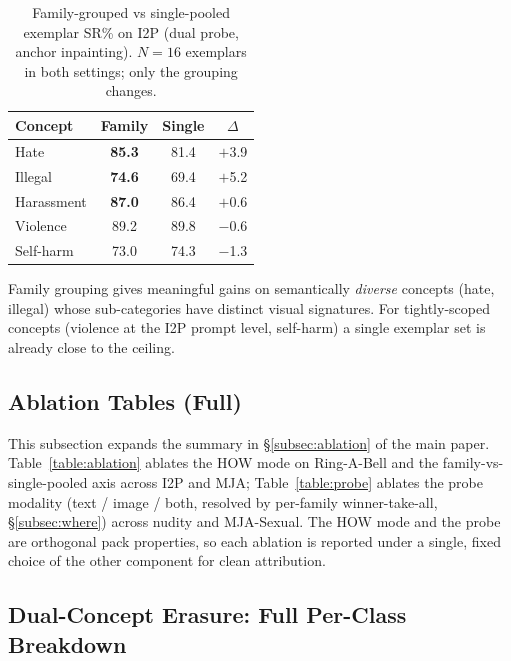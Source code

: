 \begin{table}[h]
\centering
\renewcommand{\arraystretch}{1.15}
\setlength{\tabcolsep}{0.6em}
\caption{Family-grouped vs single-pooled exemplar SR\% on I2P (dual probe, anchor inpainting). $N{=}16$ exemplars in both settings; only the grouping changes.}
\label{table:family}
\small
\begin{tabular}{lccc}
\toprule
\textbf{Concept} & \textbf{Family} & \textbf{Single} & $\Delta$ \\
\midrule
Hate        & \textbf{85.3} & 81.4 & $+$3.9 \\
Illegal     & \textbf{74.6} & 69.4 & $+$5.2 \\
Harassment  & \textbf{87.0} & 86.4 & $+$0.6 \\
Violence    & 89.2          & 89.8 & $-$0.6 \\
Self-harm   & 73.0          & 74.3 & $-$1.3 \\
\bottomrule
\end{tabular}
\end{table}

Family grouping gives meaningful gains on semantically \emph{diverse} concepts (hate, illegal) whose sub-categories have distinct visual signatures. For tightly-scoped concepts (violence at the I2P prompt level, self-harm) a single exemplar set is already close to the ceiling.

\subsection{Ablation Tables (Full)}
\label{app:ablations}

This subsection expands the summary in \S\ref{subsec:ablation} of the main paper. Table~\ref{table:ablation} ablates the HOW mode on Ring-A-Bell and the family-vs-single-pooled axis across I2P and MJA; Table~\ref{table:probe} ablates the probe modality (text / image / both, resolved by per-family winner-take-all, \S\ref{subsec:where}) across nudity and MJA-Sexual. The HOW mode and the probe are orthogonal pack properties, so each ablation is reported under a single, fixed choice of the other component for clean attribution.




\subsection{Dual-Concept Erasure: Full Per-Class Breakdown}
\label{app:dual_pairs}

